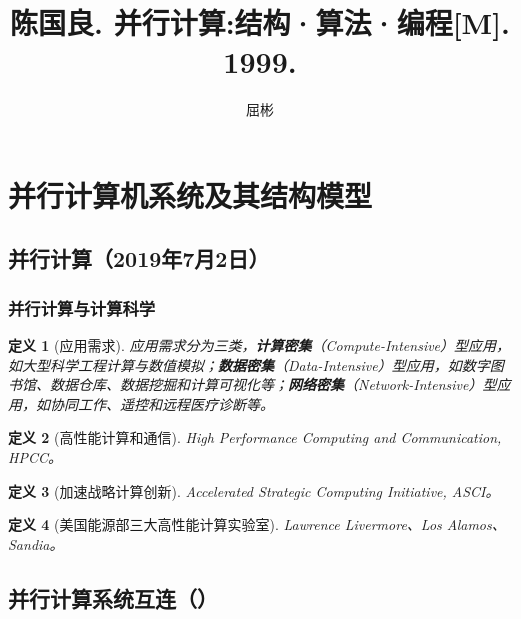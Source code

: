 \documentclass{article}
\newtheorem{definition}{定义}[section]
\begin{document}
	\title{陈国良. 并行计算:结构·算法·编程[M]. 1999.}
	\author{屈彬}
	\maketitle
	
	\section{并行计算机系统及其结构模型}
		\subsection{并行计算（2019年7月2日）}
			\subsubsection{并行计算与计算科学}
				\begin{definition}[应用需求]
					应用需求分为三类，\textbf{计算密集}（Compute-Intensive）型应用，如大型科学工程计算与数值模拟；\textbf{数据密集}（Data-Intensive）型应用，如数字图书馆、数据仓库、数据挖掘和计算可视化等；\textbf{网络密集}（Network-Intensive）型应用，如协同工作、遥控和远程医疗诊断等。
				\end{definition}
				\begin{definition}[高性能计算和通信]
					High Performance Computing and Communication, HPCC。
				\end{definition}
				\begin{definition}[加速战略计算创新]
					Accelerated Strategic Computing Initiative, ASCI。
				\end{definition}
				\begin{definition}[美国能源部三大高性能计算实验室]
					Lawrence Livermore、Los Alamos、Sandia。
				\end{definition}
		\subsection{并行计算系统互连（）}
\end{document}
